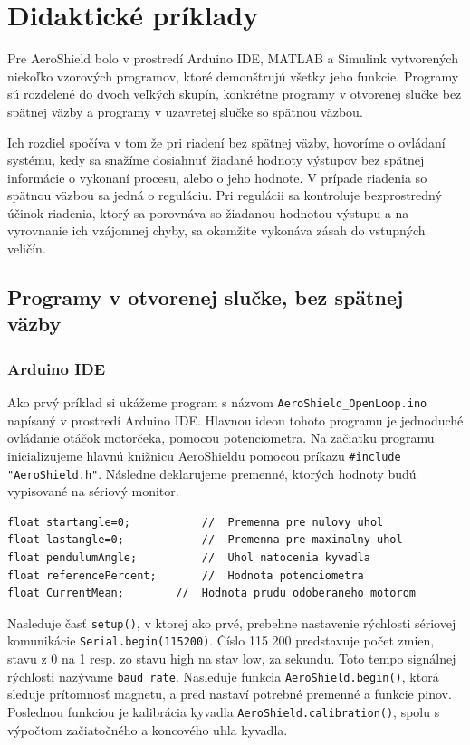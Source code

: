 \chapter{Didaktické príklady}
\label{Didaktické príklady}

Pre AeroShield bolo v prostredí Arduino IDE, MATLAB a Simulink vytvorených niekoľko vzorových programov, ktoré demonštrujú všetky jeho funkcie. Programy sú rozdelené do dvoch veľkých skupín, konkrétne programy v otvorenej slučke bez spätnej väzby a programy v uzavretej slučke so spätnou väzbou. 

Ich rozdiel spočíva v tom že pri riadení bez spätnej väzby, hovoríme o ovládaní systému, kedy sa snažíme dosiahnuť žiadané hodnoty výstupov bez spätnej informácie o vykonaní procesu, alebo o jeho hodnote. V prípade riadenia so spätnou väzbou sa jedná o reguláciu. Pri regulácii sa kontroluje bezprostredný účinok riadenia, ktorý sa porovnáva so žiadanou hodnotou výstupu a na vyrovnanie ich vzájomnej chyby, sa okamžite vykonáva zásah do vstupných veličín. 

\section{Programy v otvorenej slučke, bez spätnej väzby}
\subsection{Arduino IDE}

Ako prvý príklad si ukážeme program s názvom \verb|AeroShield_OpenLoop.ino| napísaný v prostredí Arduino IDE. Hlavnou ideou tohoto programu je jednoduché ovládanie otáčok motorčeka, pomocou potenciometra. Na začiatku programu inicializujeme hlavnú knižnicu AeroShieldu pomocou príkazu \verb|#include "AeroShield.h"|. Následne deklarujeme premenné, ktorých hodnoty budú vypisované na sériový monitor. 

\begin{lstlisting}[caption={AeroShield open loop dekleracia.},captionpos=b]
float startangle=0;           //  Premenna pre nulovy uhol
float lastangle=0;            //  Premenna pre maximalny uhol 
float pendulumAngle;          //  Uhol natocenia kyvadla
float referencePercent;       //  Hodnota potenciometra
float CurrentMean;	      //  Hodnota prudu odoberaneho motorom 
\end{lstlisting}

Nasleduje časť \verb|setup()|, v ktorej ako prvé, prebehne nastavenie rýchlosti sériovej komunikácie \verb|Serial.begin(115200)|. Číslo 115 200 predstavuje počet zmien, stavu z 0 na 1 resp. zo stavu high na stav low, za sekundu. Toto tempo signálnej rýchlosti nazývame \verb|baud rate|. Nasleduje funkcia \verb|AeroShield.begin()|, ktorá sleduje prítomnosť magnetu, a pred nastaví potrebné premenné a funkcie pinov. Poslednou funkciou je kalibrácia kyvadla \verb|AeroShield.calibration()|, spolu s výpočtom začiatočného a koncového uhla kyvadla. 

